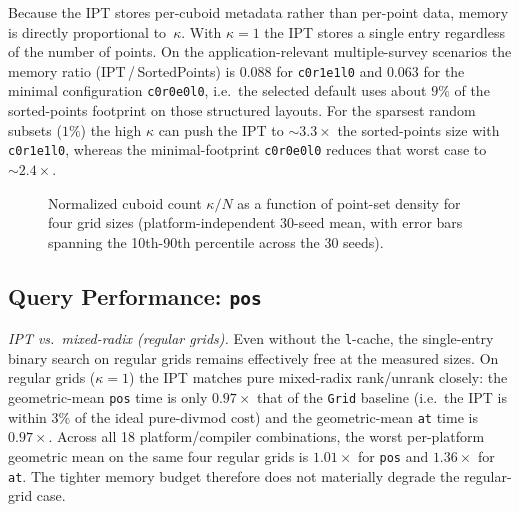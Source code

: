 \documentclass[manuscript,screen,review]{acmart}
\theoremstyle{definition}
\theoremstyle{plain}
\begin{document}
Because the IPT stores per-cuboid metadata rather than per-point
data, memory is directly proportional to~$\kappa$.
With $\kappa = 1$ the IPT stores a single entry regardless of the
number of points.
On the application-relevant multiple-survey scenarios the
memory ratio (IPT\,/\,SortedPoints) is $0.088$
for \texttt{c0r1e1l0} and $0.063$ for the minimal
configuration \texttt{c0r0e0l0},
i.e.\ the selected default uses about $9\%$ of the sorted-points
footprint on those structured layouts.
For the sparsest random subsets ($1\%$) the high $\kappa$ can
push the IPT to ${\sim}\!3.3\times$ the sorted-points size with
\texttt{c0r1e1l0}, whereas the minimal-footprint \texttt{c0r0e0l0} reduces
that worst case to ${\sim}\!2.4\times$.

\begin{figure}
\centering

\caption{Normalized cuboid count $\kappa/N$ as a function of
  point-set density for four grid sizes (platform-independent 30-seed
  mean, with error bars spanning the 10th-90th percentile across the 30
  seeds).}
\label{figure:kappa}
\end{figure}

\subsection{Query Performance: \texttt{pos}}
\label{section:results-pos}

\emph{IPT vs.\ mixed-radix (regular grids).}
Even without the \texttt{l}-cache, the single-entry binary search on
regular grids remains effectively free at the measured sizes.
On regular grids ($\kappa = 1$) the IPT matches pure mixed-radix
rank/unrank closely: the geometric-mean \texttt{pos} time is only
$0.97\times$ that of the \texttt{Grid} baseline (i.e.\ the IPT is
within $3\%$ of the ideal pure-divmod cost) and the geometric-mean
\texttt{at} time is $0.97\times$. Across all 18
platform/compiler combinations, the worst per-platform geometric mean
on the same four regular grids is $1.01\times$ for \texttt{pos} and
$1.36\times$ for \texttt{at}.
The tighter memory budget therefore does not materially degrade the
regular-grid case.
\end{document}
